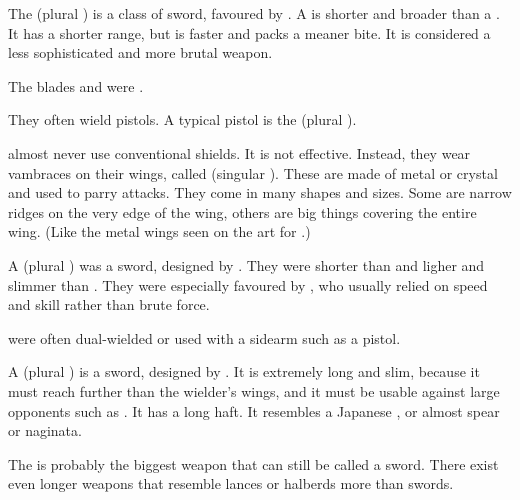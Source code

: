 \begin{gloss}
  \gitem[\belthradeth]{\belthrad}
  \index{\belthrad}
  The \belthrad{} (plural \belthradeth) is a class of sword, favoured by \Mystraacht. 
  A \belthrad{} is shorter and broader than a . 
  It has a shorter range, but is faster and packs a meaner bite. 
  It is considered a less sophisticated and more brutal weapon. 
  
  The blades  and  were \belthradeth. 
  
  
  
  \index{\ghijed}%
  They often wield pistols. 
  A typical \resphan{} pistol is the \ghijed{} (plural \ghijedeth). 
  
  
  
  \gitem[\kilghain]{\kilghan}
  \index{\kilghan}%
  \Resphain{} almost never use conventional shields. 
  It is not effective. 
  Instead, they wear vambraces on their wings, called \kilghain{} (singular \kilghan). 
  These are made of metal or crystal and used to parry attacks. 
  They come in many shapes and sizes.
  Some are narrow ridges on the very edge of the wing, others are big things covering the entire wing. 
  (Like the metal wings seen on the art for \cite{SymphonyX:ParadiseLost}.) 
  
  
  
  \gitem[\ruthiel]{\ruthil}
  A \ruthil{} (plural \ruthiel) was a \resphan{} sword, designed by \TiphredSerah. 
  They were shorter than \senain{} and ligher and slimmer than \belthradeth. 
  They were especially favoured by \resviel, who usually relied on speed and skill rather than brute force. 
  
  \Ruthiel{} were often dual-wielded or used with a sidearm such as a pistol. 
  
  
  
  \gitem[\senain]{\senaan}
  \index{\senaan}
  A \senaan{} (plural \senain) is a \resphan{} sword, designed by \CiriathSepher. 
  It is extremely long and slim, because it must reach further than the \resphan{} wielder's wings, and it must be usable against large opponents such as \dragons. 
  It has a long haft. 
  It resembles a Japanese \zanbatou, or almost spear or naginata. 
  
  The \senaan{} is probably the biggest \resphan{} weapon that can still be called a sword. 
  There exist even longer weapons that resemble lances or halberds more than swords. 
\end{gloss}









